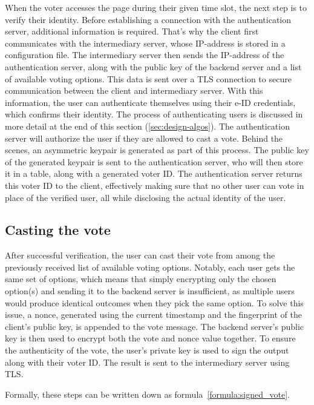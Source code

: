 \documentclass[a4paper,12pt,english]{article}
\begin{document}
When the voter accesses the page during their given time slot, the next step is to verify their identity. Before establishing a connection with the authentication server, additional information is required. That’s why the client first communicates with the intermediary server, whose IP-address is stored in a configuration file. The intermediary server then sends the IP-address of the authentication server, along with the public key of the backend server and a list of available voting options. This data is sent over a TLS connection to secure communication between the client and intermediary server. With this information, the user can authenticate themselves using their e-ID credentials, which confirms their identity. The process of authenticating users is discussed in more detail at the end of this section (\ref{sec:design-algos}). The authentication server will authorize the user if they are allowed to cast a vote. Behind the scenes, an asymmetric keypair is generated as part of this process. The public key of the generated keypair is sent to the authentication server, who will then store it in a table, along with a generated voter ID. The authentication server returns this voter ID to the client, effectively making sure that no other user can vote in place of the verified user, all while disclosing the actual identity of the user.

\subsection{Casting the vote}\label{sec:design-casting}

After successful verification, the user can cast their vote from among the previously received list of available voting options. Notably, each user gets the same set of options, which means that simply encrypting only the chosen option(s) and sending it to the backend server is insufficient, as multiple users would produce identical outcomes when they pick the same option. To solve this issue, a nonce, generated using the current timestamp and the fingerprint of the client's public key, is appended to the vote message. The backend server's public key is then used to encrypt both the vote and nonce value together. To ensure the authenticity of the vote, the user's private key is used to sign the output along with their voter ID. The result is sent to the intermediary server using TLS.

Formally, these steps can be written down as formula~\ref{formula:signed_vote}.
\end{document}
